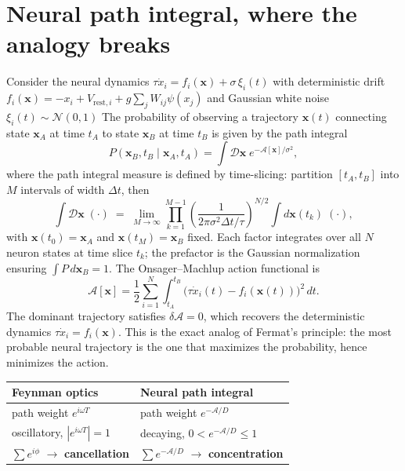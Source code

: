 \documentclass[11pt,a4paper]{article}
\begin{document}
\section{Neural path integral, where the analogy breaks}
\label{sec:neural_path}

Consider the neural dynamics $\tau\dot{x}_i = f_i(\mathbf{x}) + \sigma\,\xi_i(t)$ 
with deterministic drift 
$f_i(\mathbf{x}) = -x_i + V_{\text{rest},i} + g\sum_j W_{ij}\psi(x_j)$ 
and Gaussian white noise $\xi_i(t) \sim \mathcal{N}(0,1)$ 
The probability of observing a trajectory $\mathbf{x}(t)$ connecting state 
$\mathbf{x}_A$ at time $t_A$ to state $\mathbf{x}_B$ at time $t_B$ is 
given by the path integral
\begin{equation}
P(\mathbf{x}_B, t_B \mid \mathbf{x}_A, t_A) = \int \mathcal{D}\mathbf{x}\; 
e^{-\mathcal{A}[\mathbf{x}]/\sigma^2},
\label{eq:onsager_machlup}
\end{equation}
where the path integral measure is defined by time-slicing: partition 
$[t_A, t_B]$ into $M$ intervals of width $\Delta t$, then
\begin{equation}
\int \mathcal{D}\mathbf{x} \;(\cdot) \;=\; 
\lim_{M\to\infty} \prod_{k=1}^{M-1} 
\left(\frac{1}{2\pi\sigma^2\Delta t/\tau}\right)^{N/2}
\int d\mathbf{x}(t_k) \;(\cdot),
\label{eq:path_measure}
\end{equation}
with $\mathbf{x}(t_0) = \mathbf{x}_A$ and $\mathbf{x}(t_M) = \mathbf{x}_B$ 
fixed. Each factor integrates over all $N$ neuron states at time slice $t_k$; 
the prefactor is the Gaussian normalization ensuring $\int P\, 
d\mathbf{x}_B = 1$. The Onsager--Machlup action functional is
\begin{equation}
\mathcal{A}[\mathbf{x}] = \frac{1}{2}\sum_{i=1}^{N} \int_{t_A}^{t_B} 
\bigl(\tau\dot{x}_i(t) - f_i(\mathbf{x}(t))\bigr)^2\, dt.
\label{eq:om_action}
\end{equation}
The dominant trajectory satisfies $\delta\mathcal{A} = 0$, which recovers 
the deterministic dynamics $\tau\dot{x}_i = f_i(\mathbf{x})$. This is the 
exact analog of Fermat's principle: the most probable neural trajectory is 
the one that maximizes the probability, hence minimizes the action.

\begin{center}
\renewcommand{\arraystretch}{1.2}
\begin{tabular}{@{}ll@{}}
\toprule
\textbf{Feynman optics} & \textbf{Neural path integral} \\
\midrule
path weight $e^{i\omega T}$ & path weight $e^{-\mathcal{A}/D}$ \\
oscillatory, $|e^{i\omega T}| = 1$ & decaying, $0 < e^{-\mathcal{A}/D} \leq 1$ \\
$\sum e^{i\phi}$ $\to$ \textbf{cancellation} & $\sum e^{-\mathcal{A}/D}$ $\to$ \textbf{concentration} \\
\bottomrule
\end{tabular}
\end{center}
\end{document}
